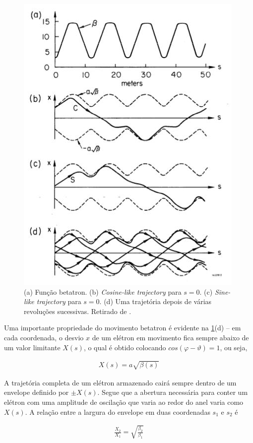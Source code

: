 \begin{figure}[!htb]
	\centering
	\includegraphics[width=0.7\linewidth]{./Figuras/fig12.jpeg}
	\caption{(a) Função betatron. (b) \textit{Cosine-like trajectory} para $s=0$. (c) \textit{Sine-like trajectory} para $s=0$. (d) Uma trajetória depois de várias revoluções sucessivas. Retirado de \cite{sands1970physics}.}
	\label{fig:fig12}
\end{figure}
	
Uma importante propriedade do movimento betatron é evidente na \ref{fig:fig12}(d) -- em cada coordenada, o desvio $x$ de um elétron em movimento fica sempre abaixo de um valor limitante $X(s)$, o qual é obtido colocando $cos(\varphi-\vartheta)=1$, ou seja,
	
\begin{align}
	X(s) = a\sqrt{\beta(s)}
\end{align}
	
A trajetória completa de um elétron armazenado cairá sempre dentro de um envelope definido por $\pm X(s)$. Segue que a abertura necessária para conter um elétron com uma amplitude de oscilação que varia ao redor do anel varia como $X(s)$. A relação entre a largura do envelope em duas coordenadas $s_1$ e $s_2$ é
	
\begin{align}
	\frac{X_2}{X_1} = \sqrt{\frac{\beta_2}{\beta_1}}
\end{align}
	
